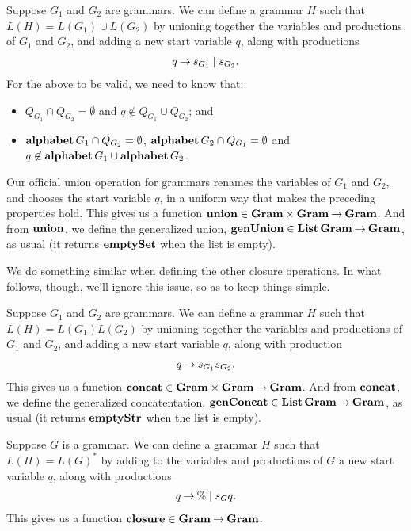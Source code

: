 Suppose $G_1$ and $G_2$ are grammars.  We can define a grammar $H$
such that $L(H)=L(G_1)\cup L(G_2)$ by unioning together the variables
and productions of $G_1$ and $G_2$, and adding a new start variable
$q$, along with productions
\begin{gather*}
  q\mathbin{\to} s_{G_1}\mid s_{G_2} .
\end{gather*}
For the above to be valid, we need to know that:
\begin{itemize}
\item $Q_{G_1}\cap Q_{G_2}=\emptyset$ and
$q\not\in Q_{G_1}\cup Q_{G_2}$; and

\item $\mathbf{alphabet}\,G_1\cap Q_{G_2}=\emptyset$,
$\mathbf{alphabet}\,G_2\cap Q_{G_1}=\emptyset$ and
$q\not\in\mathbf{alphabet}\,G_1\cup\mathbf{alphabet}\,G_2$.
\end{itemize}
Our official union operation for grammars renames the variables
of $G_1$ and $G_2$, and chooses the start variable $q$,
in a uniform way that makes the preceding properties hold.
This gives us a function
$\mathbf{union}\in\mathbf{Gram}\times\mathbf{Gram}\mathbin{\to}\mathbf{Gram}$.
%
%
%
And from $\mathbf{union}$, we define the generalized union,
$\mathbf{genUnion}\in\mathbf{List}\,\mathbf{Gram}\mathbin{\to}\mathbf{Gram}$, as usual (it returns
$\mathbf{emptySet}$ when the list is empty).

We do something similar when defining the other closure
operations.  In what follows, though, we'll ignore this issue,
so as to keep things simple.

Suppose $G_1$ and $G_2$ are grammars.  We can define a grammar $H$
such that $L(H)=L(G_1)L(G_2)$ by unioning together the variables and
productions of $G_1$ and $G_2$, and adding a new start variable $q$,
along with production
\begin{gather*}
  q\mathbin{\to} s_{G_1}s_{G_2} .
\end{gather*}
This gives us a function $\mathbf{concat}\in\mathbf{Gram}\times\mathbf{Gram}\mathbin{\to}\mathbf{Gram}$.
%
%
%
And from $\mathbf{concat}$, we define the generalized concatentation,
$\mathbf{genConcat}\in\mathbf{List}\,\mathbf{Gram}\mathbin{\to}\mathbf{Gram}$, as usual (it returns
$\mathbf{emptyStr}$ when the list is empty).

Suppose $G$ is a grammar.  We can define a grammar $H$ such that
$L(H)=L(G)^*$ by adding to the variables and productions of $G$ a new
start variable $q$, along with productions
\begin{gather*}
q\mathbin{\to} \%\mid s_Gq .
\end{gather*}
This gives us a function $\mathbf{closure}\in\mathbf{Gram}\mathbin{\to}\mathbf{Gram}$.
%
%
%

